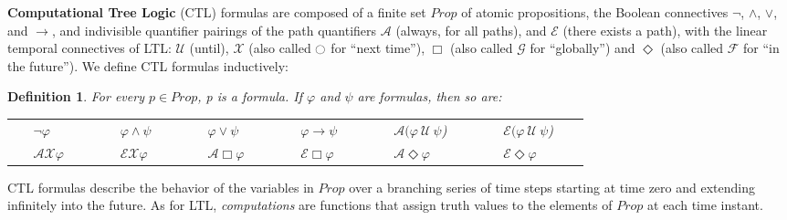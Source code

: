 \documentclass{elsarticle} %
\newtheorem{defin}{Definition}
\renewcommand{\phi}{\varphi}
\begin{document}


{\bf Computational Tree Logic} (CTL) formulas are composed of a finite set $Prop$ of atomic propositions, the Boolean connectives $\neg$, $\wedge$, $\vee$, and $\rightarrow$, and indivisible quantifier pairings of the path quantifiers $\mathcal{A}$ (always, for all paths), and $\mathcal{E}$ (there exists a path), with the linear temporal connectives of LTL: $\mathcal{U}$ (until), %
$\mathcal{X}$ (also called $\ocircle$ for ``next time''), $\Box$ (also called $\mathcal{G}$ for ``globally'') and $\Diamond$ (also called $\mathcal{F}$ for ``in the future''). We define CTL formulas inductively:

\begin{defin}\label{CTL_Syntax} 
For every $p \in Prop$, p is a formula. If $\phi$ and $\psi$ are formulas, then so are:

\begin{tabular}{llllll}
\ \ \ $\neg \phi$ \ \ \ &
\ \ \ $\phi \wedge \psi$ \ \ \ &
\ \ \ $\phi \vee \psi$ \ \ \ &
\ \ \ $\phi \rightarrow \psi$ \ \ \ &
\ \ \ $\mathcal{A}(\phi \ \mathcal{U} \ \psi$) \ \ \ &
\ \ \ $\mathcal{E}(\phi \ \mathcal{U} \ \psi$) \ \ \ \\
\ \ \ $\mathcal{AX} \phi$ \ \ \ &
\ \ \ $\mathcal{EX} \phi$ \ \ \ &
\ \ \ $\mathcal{A}\Box \phi$ \ \ \ &
\ \ \ $\mathcal{E}\Box \phi$ \ \ \ &
\ \ \ $\mathcal{A}\Diamond \phi$ \ \ \ &
\ \ \ $\mathcal{E}\Diamond \phi$ \ \ \ \\
\end{tabular}
\end{defin}
\noindent
CTL formulas describe the behavior of the variables in $Prop$ over a branching series of time steps starting at time zero and extending infinitely into the future. As for LTL, \emph{computations} are functions that assign truth values to the elements of $Prop$ at each time instant.
\end{document}
